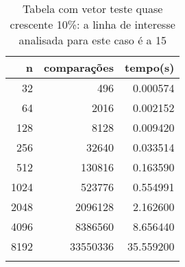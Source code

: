 \begin{table}[ht]
\centering
\begin{tabular}{rrr} \toprule
        n &    comparações &       tempo(s) \\ \midrule
      32  &            496 &      0.000574 \\
      64  &           2016 &      0.002152 \\
     128  &           8128 &      0.009420 \\
     256  &          32640 &      0.033514 \\
     512  &         130816 &      0.163590 \\
    1024  &         523776 &      0.554991 \\
    2048  &        2096128 &      2.162600 \\
    4096  &        8386560 &      8.656440 \\
    8192  &       33550336 &     35.559200 \\
\bottomrule\addlinespace
\end{tabular}
\caption{Tabela com vetor teste quase crescente 10\%: a linha de interesse analisada para este caso é a 15}
\label{tab:bolhaQuaseCresc10}
\end{table}
